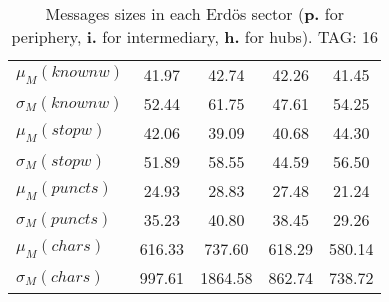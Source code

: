 \begin{table}[h!]
\begin{center}
\begin{tabular}{| l || c | c | c | c |}
$\mu_M(knownw)$ & 41.97  & 42.74  & 42.26  & 41.45 \\
$\sigma_M(knownw)$ & 52.44  & 61.75  & 47.61  & 54.25 \\\hline
$\mu_M(stopw)$ & 42.06  & 39.09  & 40.68  & 44.30 \\
$\sigma_M(stopw)$ & 51.89  & 58.55  & 44.59  & 56.50 \\\hline
$\mu_M(puncts)$ & 24.93  & 28.83  & 27.48  & 21.24 \\
$\sigma_M(puncts)$ & 35.23  & 40.80  & 38.45  & 29.26 \\\hline
$\mu_M(chars)$ & 616.33  & 737.60  & 618.29  & 580.14 \\
$\sigma_M(chars)$ & 997.61  & 1864.58  & 862.74  & 738.72 \\\hline
\end{tabular}
\caption{Messages sizes in each Erd\"os sector ({{\bf p.}} for periphery, {{\bf i.}} for intermediary, {{\bf h.}} for hubs). TAG: 16}
\end{center}
\end{table}